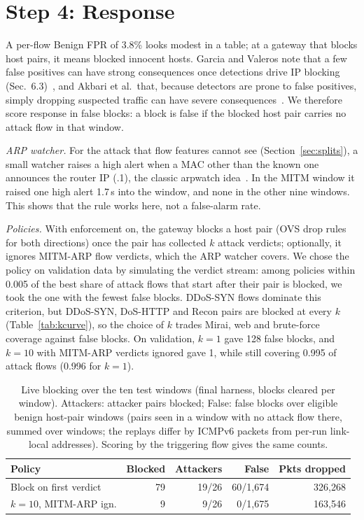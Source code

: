 \section{Step 4: Response}\label{sec:response}

A per-flow Benign FPR of 3.8\% looks modest in a table; at a gateway that blocks host pairs, it means blocked innocent hosts. Garcia and Valeros note that a few false positives can have strong consequences once detections drive IP blocking (Sec.~6.3)~\cite{garcia2023labeling}, and Akbari et al.\ that, because detectors are prone to false positives, simply dropping suspected traffic can have severe consequences~\cite{akbari2020atmos}. We therefore score response in false blocks: a block is false if the blocked host pair carries no attack flow in that window.

\emph{ARP watcher.} For the attack that flow features cannot see (Section~\ref{sec:splits}), a small watcher raises a high alert when a MAC other than the known one announces the router IP (.1), the classic arpwatch idea~\cite{arpwatch}. In the MITM window it raised one high alert 1.7\,s into the window, and none in the other nine windows. This shows that the rule works here, not a false-alarm rate.

\emph{Policies.} With enforcement on, the gateway blocks a host pair (OVS drop rules for both directions) once the pair has collected $k$ attack verdicts; optionally, it ignores MITM-ARP flow verdicts, which the ARP watcher covers. We chose the policy on validation data by simulating the verdict stream: among policies within 0.005 of the best share of attack flows that start after their pair is blocked, we took the one with the fewest false blocks. DDoS-SYN flows dominate this criterion, but DDoS-SYN, DoS-HTTP and Recon pairs are blocked at every $k$ (Table~\ref{tab:kcurve}), so the choice of $k$ trades Mirai, web and brute-force coverage against false blocks. On validation, $k=1$ gave 128 false blocks, and $k=10$ with MITM-ARP verdicts ignored gave 1, while still covering 0.995 of attack flows (0.996 for $k=1$).

\begin{table}[t]
\centering
\caption{Live blocking over the ten test windows (final harness, blocks cleared per window). Attackers: attacker pairs blocked; False: false blocks over eligible benign host-pair windows (pairs seen in a window with no attack flow there, summed over windows; the replays differ by ICMPv6 packets from per-run link-local addresses). Scoring by the triggering flow gives the same counts.}
\label{tab:blocking}
\footnotesize
\setlength{\tabcolsep}{3pt}
\begin{tabular}{lrrrr}
\hline
Policy & Blocked & Attackers & False & Pkts dropped \\
\hline
Block on first verdict & 79 & 19/26 & 60/1,674 & 326,268 \\
$k=10$, MITM-ARP ign. & 9 & 9/26 & 0/1,675 & 163,546 \\
\hline
\end{tabular}
\end{table}

